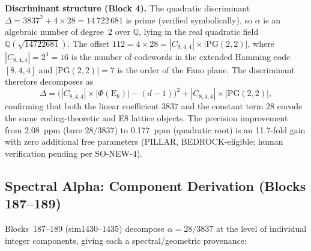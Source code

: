 \documentclass[aps,prd,twocolumn,superscriptaddress,floatfix,nofootinbib]{revtex4-2}
\theoremstyle{definition}
\theoremstyle{remark}
\begin{document}
\noindent\textbf{Discriminant structure (Block 4).}
The quadratic discriminant $\Delta = 3837^2 + 4 \times 28 = 14\,722\,681$ is prime
(verified symbolically), so $\alpha$ is an algebraic number of degree~2 over
$\mathbb{Q}$, lying in the real quadratic field $\mathbb{Q}(\sqrt{14722681})$.
The offset $112 = 4 \times 28 = |C_{8,4,4}| \times |\mathrm{PG}(2,2)|$,
where $|C_{8,4,4}| = 2^4 = 16$ is the number of codewords in the extended
Hamming code $[8,4,4]$ and $|\mathrm{PG}(2,2)| = 7$ is the order of the Fano
plane.  The discriminant therefore decomposes as
\begin{equation}
    \Delta = \bigl(|C_{8,4,4}|\times|\Phi(\mathrm{E}_8)| - (d{-}1)\bigr)^2
           + |C_{8,4,4}| \times |\mathrm{PG}(2,2)|,
\end{equation}
confirming that both the linear coefficient 3837 and the constant term 28
encode the same coding-theoretic and E8 lattice objects.  The precision
improvement from 2.08~ppm (bare $28/3837$) to 0.177~ppm (quadratic root)
is an 11.7-fold gain with zero additional free parameters
(PILLAR, BEDROCK-eligible; human verification pending per SO-NEW-4).

\subsection{Spectral Alpha: Component Derivation (Blocks 187--189)}
\label{sec:spectral-alpha}

Blocks~187--189 (sim1430--1435) decompose $\alpha = 28/3837$ at the level of
individual integer components, giving each a spectral/geometric provenance:
\end{document}
